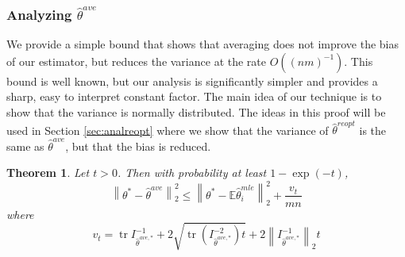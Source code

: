 \documentclass[twoside]{article}
\newtheorem{theorem}{Theorem}
\DeclareMathOperator*{\tr}{tr}
\newcommand{\E}{\mathbb{E}}
\newcommand{\w}{\theta}
\newcommand{\wreopt}{\hat\w^{reopt}}
\newcommand{\wave}{\hat\w^{ave}}
\newcommand{\wtave}{\hat\w^{ave,*}}
\newcommand{\wmle}{\hat\w^{mle}}
\newcommand{\wstar}{{\w^{*}}}
\newcommand{\I}{I}
\newcommand{\Iinv}{I^{-1}}
\newcommand{\ltwo}[1]{{\left\lVert {#1} \right\rVert}_2}
\begin{document}
\subsubsection{Analyzing $\wave$}

We provide a simple bound that shows that averaging does not improve the bias of our estimator,
but reduces the variance at the rate $O((nm)^{-1})$.
This bound is well known, but our analysis is significantly simpler and provides a sharp, easy to interpret constant factor.
The main idea of our technique is to show that the variance is normally distributed.
The ideas in this proof will be used in Section \ref{sec:analreopt} where we show that the variance of $\wreopt$ is the same as $\wave$, but that the bias is reduced.

\begin{theorem}
Let $t>0$.
Then with probability at least $1-\exp(-t)$,
\begin{equation}
\ltwo{\wstar-\wave}^2 \le \ltwo{\wstar-\E\wmle_i}^2 + \frac{v_t}{mn}
\end{equation}
where
\begin{equation}
v_t =
\tr{\Iinv_{\wtave}}
+ 2\sqrt{\tr ({\I^{-2}_{\wtave}})t}
+ 2\ltwo{\Iinv_{\wtave}}t
\end{equation}
\end{theorem}
\end{document}

